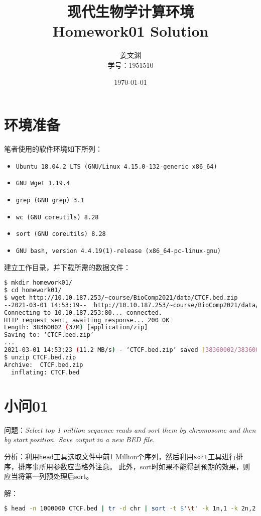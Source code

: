 \documentclass[cn,black,11pt,normal]{elegantnote}
\title{现代生物学计算环境\\Homework01 Solution}
\author{姜文渊\\学号：1951510}
\institute{School of Life Science, Tongji University}
\date{\today}
\begin{document}
\maketitle

\section{环境准备}
笔者使用的软件环境如下所列：
\begin{itemize}
    \item \lstinline{Ubuntu 18.04.2 LTS (GNU/Linux 4.15.0-132-generic x86_64)}
    \item \lstinline{GNU Wget 1.19.4}
    \item \lstinline{grep (GNU grep) 3.1}
    \item \lstinline{wc (GNU coreutils) 8.28}
    \item \lstinline{sort (GNU coreutils) 8.28}
    \item \lstinline{GNU bash, version 4.4.19(1)-release (x86_64-pc-linux-gnu)}
\end{itemize}
建立工作目录，并下载所需的数据文件：
\begin{lstlisting}[language=bash]
$ mkdir homework01/
$ cd homework01/
$ wget http://10.10.187.253/~course/BioComp2021/data/CTCF.bed.zip
--2021-03-01 14:53:19--  http://10.10.187.253/~course/BioComp2021/data/CTCF.bed.zip
Connecting to 10.10.187.253:80... connected.
HTTP request sent, awaiting response... 200 OK
Length: 38360002 (37M) [application/zip]
Saving to: ‘CTCF.bed.zip’
...   
2021-03-01 14:53:23 (11.2 MB/s) - ‘CTCF.bed.zip’ saved [38360002/38360002]
$ unzip CTCF.bed.zip
Archive:  CTCF.bed.zip
  inflating: CTCF.bed
\end{lstlisting}
\section{小问01}
问题：\textit{Select top 1 million sequence reads and sort them by chromosome and then 
by start position. Save output in a new BED file.}

分析：利用\texttt{head}工具选取文件中前1 Million个序列，然后利用\texttt{sort}工具进行排序，排序事所用参数应当格外注意。
此外，sort时如果不能得到预期的效果，则应当将第一列预处理后sort。

解：
\begin{lstlisting}[language=bash]
$ head -n 1000000 CTCF.bed | tr -d chr | sort -t $'\t' -k 1n,1 -k 2n,2 | sed 's|^|chr&|g' > CTCF_top1M_sorted.bed
\end{lstlisting}
\end{document}
